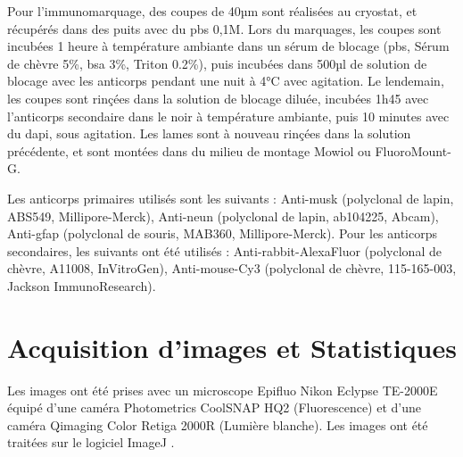 	Pour l'immunomarquage, des coupes de 40µm sont réalisées au cryostat, et récupérés dans des puits avec du \acrshort{pbs} 0,1M. Lors du marquages, les coupes sont incubées 1 heure à température ambiante dans un sérum de blocage (\acrshort{pbs}, Sérum de chèvre 5\%, \acrshort{bsa} 3\%, Triton 0.2\%), puis  incubées dans 500µl de solution de blocage avec les anticorps pendant une nuit à 4°C avec agitation. Le lendemain, les coupes sont rinçées dans la solution de blocage diluée, incubées 1h45 avec l'anticorps secondaire dans le noir à température ambiante, puis 10 minutes avec du \gls{dapi}, sous agitation. Les lames sont à nouveau rinçées dans la solution précédente, et sont montées dans du milieu de montage Mowiol ou FluoroMount-G.
	
	Les anticorps primaires utilisés sont les suivants : Anti-\acrshort{musk} (polyclonal de lapin, ABS549, Millipore-Merck),  Anti-\acrshort{neun} (polyclonal de lapin, ab104225, Abcam), Anti-\acrshort{gfap} (polyclonal de souris, MAB360, Millipore-Merck). Pour les anticorps secondaires, les suivants ont été utilisés : Anti-rabbit-AlexaFluor (polyclonal de chèvre, A11008, InVitroGen), Anti-mouse-Cy3 (polyclonal de chèvre, 115-165-003, Jackson ImmunoResearch).
	
\section{Acquisition d'images et Statistiques}
\label{sec:ImagesStats}
	Les images ont été prises avec un microscope Epifluo Nikon Eclypse TE-2000E équipé d'une caméra Photometrics CoolSNAP HQ2 (Fluorescence) et d'une caméra Qimaging Color Retiga 2000R (Lumière blanche).
	Les images ont été traitées sur le logiciel ImageJ \cite{Schneider2012}.